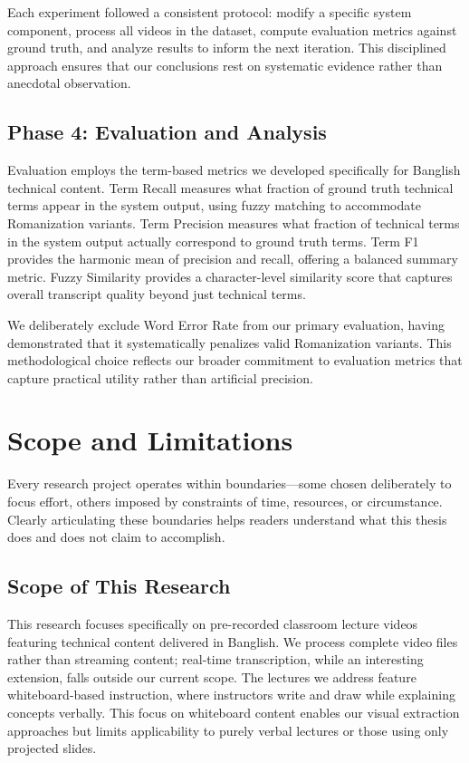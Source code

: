 Each experiment followed a consistent protocol: modify a specific system component, process all videos in the dataset, compute evaluation metrics against ground truth, and analyze results to inform the next iteration. This disciplined approach ensures that our conclusions rest on systematic evidence rather than anecdotal observation.

\subsection{Phase 4: Evaluation and Analysis}

Evaluation employs the term-based metrics we developed specifically for Banglish technical content. Term Recall measures what fraction of ground truth technical terms appear in the system output, using fuzzy matching to accommodate Romanization variants. Term Precision measures what fraction of technical terms in the system output actually correspond to ground truth terms. Term F1 provides the harmonic mean of precision and recall, offering a balanced summary metric. Fuzzy Similarity provides a character-level similarity score that captures overall transcript quality beyond just technical terms.

We deliberately exclude Word Error Rate from our primary evaluation, having demonstrated that it systematically penalizes valid Romanization variants. This methodological choice reflects our broader commitment to evaluation metrics that capture practical utility rather than artificial precision.

\section{Scope and Limitations}

Every research project operates within boundaries---some chosen deliberately to focus effort, others imposed by constraints of time, resources, or circumstance. Clearly articulating these boundaries helps readers understand what this thesis does and does not claim to accomplish.

\subsection{Scope of This Research}

This research focuses specifically on pre-recorded classroom lecture videos featuring technical content delivered in Banglish. We process complete video files rather than streaming content; real-time transcription, while an interesting extension, falls outside our current scope. The lectures we address feature whiteboard-based instruction, where instructors write and draw while explaining concepts verbally. This focus on whiteboard content enables our visual extraction approaches but limits applicability to purely verbal lectures or those using only projected slides.

